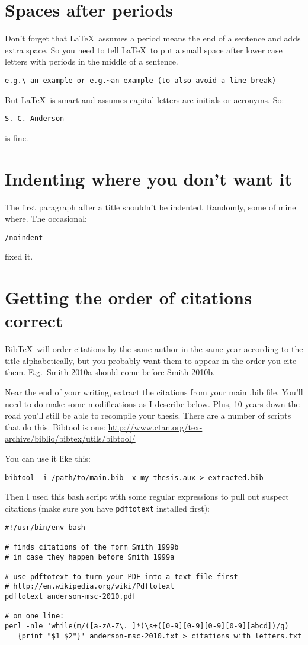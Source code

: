 \documentclass[12pt]{article}
\begin{document}
\section{Spaces after periods}
Don't forget that \LaTeX~assumes a period means the end of a sentence and adds extra space. So you need to tell \LaTeX~to put a small space after lower case letters with periods in the middle of a sentence. 
\begin{verbatim}
e.g.\ an example or e.g.~an example (to also avoid a line break)
\end{verbatim}
But \LaTeX\ is smart and assumes capital letters are initials or acronyms. So:
\begin{verbatim}
S. C. Anderson
\end{verbatim}
is fine.

\section{Indenting where you don't want it}
The first paragraph after a title shouldn't be indented. Randomly, some of mine where. The occasional:
\begin{verbatim}
/noindent 
\end{verbatim}
fixed it.

\section{Getting the order of citations correct}
Bib\TeX\ will order citations by the same author in the same year according to the title alphabetically, but you probably want them to appear in the order you cite them. E.g.\ Smith 2010a should come before Smith 2010b.

Near the end of your writing, extract the citations from your main .bib file. You'll need to do make some modifications as I describe below. Plus, 10 years down the road you'll still be able to recompile your thesis. There are a number of scripts that do this. Bibtool is one: \url{http://www.ctan.org/tex-archive/biblio/bibtex/utils/bibtool/}

You can use it like this:
\begin{verbatim}
bibtool -i /path/to/main.bib -x my-thesis.aux > extracted.bib
\end{verbatim}

Then I used this bash script with some regular expressions to pull out suspect citations (make sure you have \verb#pdftotext# installed first):
\begin{verbatim}
#!/usr/bin/env bash

# finds citations of the form Smith 1999b
# in case they happen before Smith 1999a

# use pdftotext to turn your PDF into a text file first
# http://en.wikipedia.org/wiki/Pdftotext
pdftotext anderson-msc-2010.pdf

# on one line:
perl -nle 'while(m/([a-zA-Z\. ]*)\s+([0-9][0-9][0-9][0-9][abcd])/g)
   {print "$1 $2"}' anderson-msc-2010.txt > citations_with_letters.txt
\end{verbatim}
\end{document}
